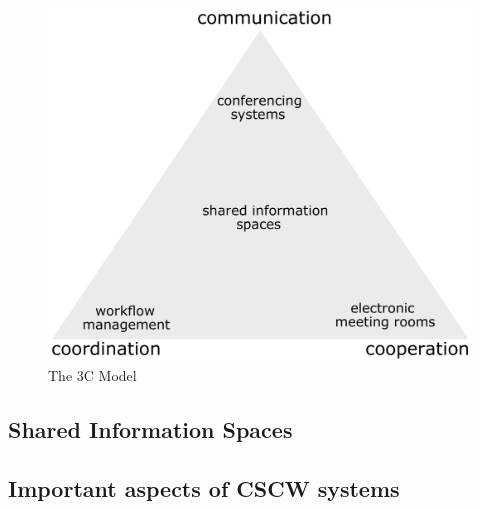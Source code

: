 \begin{figure}[H]
 \centering
 \includegraphics[width=0.8\columnwidth]{images/3C-model.pdf}
 \caption[The 3C Model]{The 3C Model \citep{Koch2008}}
\label{fig:images_cscw_3C_model}
\end{figure}


\subsection{Shared Information Spaces}
\label{sec:cscw_shared_spaces}


\subsection{Important aspects of CSCW systems}
\label{sec:cscw_req_aspects}


